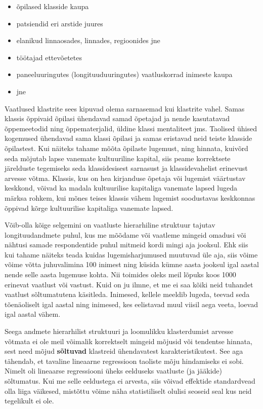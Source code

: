 \documentclass[
]{book}
\providecommand{\tightlist}{%
  \setlength{\itemsep}{0pt}\setlength{\parskip}{0pt}}
\begin{document}
\begin{itemize}
\tightlist
\item
  õpilased klasside kaupa
\item
  patsiendid eri arstide juures
\item
  elanikud linnaosades, linnades, regioonides jne
\item
  töötajad ettevõetetes
\item
  paneeluuringutes (longituuduuringutes) vaatluskorrad inimeste kaupa
\item
  jne
\end{itemize}

Vaatlused klastrite sees kipuvad olema sarnasemad kui klastrite vahel. Samas klassis õppivaid õpilasi ühendavad samad õpetajad ja nende kasutatavad õppemeetodid ning õppematerjalid, üldine klassi mentaliteet jms. Taolised ühised kogemused ühendavad sama klassi õpilasi ja samas eristavad neid teiste klasside õpilastest. Kui näiteks tahame mõõta õpilaste lugemust, ning hinnata, kuivõrd seda mõjutab lapse vanemate kultuuriline kapital, siis peame korrektsete järelduste tegemiseks seda klassidesisest sarnasust ja klassidevahelist erinevust arvesse võtma. Klassis, kus on hea kirjanduse õpetaja või lugemist väärtustav keskkond, võivad ka madala kultuurilise kapitaliga vanemate lapsed lugeda märksa rohkem, kui mõnes teises klassis vähem lugemist soodustavas keskkonnas õppivad kõrge kultuurilise kapitaliga vanemate lapsed.

Võib-olla kõige selgemini on vaatluste hierarhiline struktuur tajutav longituudandmete puhul, kus me mõõdame või vaatleme mingeid omadusi või nähtusi samade respondentide puhul mitmeid kordi mingi aja jooksul. Ehk siis kui tahame näiteks teada kuidas lugemisharjumused muutuvad üle aja, siis võime võime võtta juhuvalimina 100 inimest ning küsida kümne aasta jooksul igal aastal nende selle aasta lugemuse kohta. Nii toimides oleks meil lõpuks koos 1000 erinevat vaatlust või vastust. Kuid on ju ilmne, et me ei saa kõiki neid tuhandet vaatlust sõltumatutena käsitleda. Inimesed, kellele meeldib lugeda, teevad seda tõenäoliselt igal aastal ning inimesed, kes eelistavad muul viisil aega veeta, loevad igal aastal vähem.

Seega andmete hierarhilist struktuuri ja loomulikku klasterdumist arvesse võtmata ei ole meil võimalik korrektselt mingeid mõjusid või tendentse hinnata, sest need mõjud \textbf{sõltuvad} klastreid ühendavatest karakteristikutest. See aga tähendab, et tavaline lineaarne regressioon taoliste mõju hindamiseks ei sobi. Nimelt oli lineaarse regressiooni üheks eelduseks vaatluste (ja jääkide) sõltumatus. Kui me selle eeldustega ei arvesta, siis võivad effektide standardvead olla liiga väikesed, mistõttu võime näha statistiliselt olulisi seoseid seal kus neid tegelikult ei ole.
\end{document}
